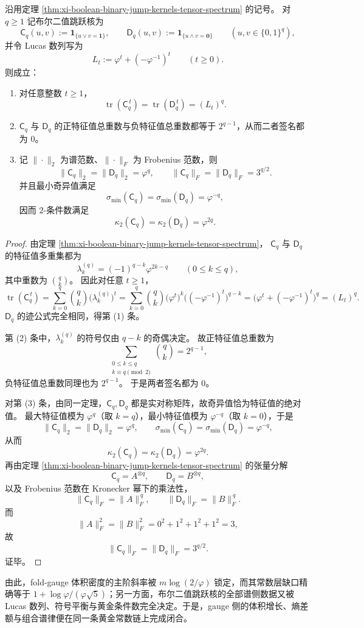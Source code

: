 \begin{theorem}\label{thm:conclusion-boolean-jump-kernel-lucas-inertia-norm}
沿用定理 \ref{thm:xi-boolean-binary-jump-kernels-tensor-spectrum} 的记号。
对 \(q\ge 1\) 记布尔二值跳跃核为
\[
\mathsf C_q(u,v):=\mathbf 1_{\{u\vee v=\mathbf 1\}},
\qquad
\mathsf D_q(u,v):=\mathbf 1_{\{u\wedge v=\mathbf 0\}}
\qquad
(u,v\in\{0,1\}^q),
\]
并令 Lucas 数列写为
\[
L_t:=\varphi^t+(-\varphi^{-1})^t
\qquad (t\ge 0).
\]
则成立：
\begin{enumerate}
  \item 对任意整数 \(t\ge 1\)，
  \[
  \operatorname{tr}(\mathsf C_q^{\,t})
  =
  \operatorname{tr}(\mathsf D_q^{\,t})
  =
  (L_t)^q.
  \]
  \item \(\mathsf C_q\) 与 \(\mathsf D_q\) 的正特征值总重数与负特征值总重数都等于 \(2^{q-1}\)，从而二者签名都为 \(0\)。
  \item 记 \(\|\cdot\|_2\) 为谱范数、\(\|\cdot\|_F\) 为 Frobenius 范数，则
  \[
  \|\mathsf C_q\|_2=\|\mathsf D_q\|_2=\varphi^q,
  \qquad
  \|\mathsf C_q\|_F=\|\mathsf D_q\|_F=3^{q/2}.
  \]
  并且最小奇异值满足
  \[
  \sigma_{\min}(\mathsf C_q)=\sigma_{\min}(\mathsf D_q)=\varphi^{-q},
  \]
  因而 \(2\)-条件数满足
  \[
  \kappa_2(\mathsf C_q)=\kappa_2(\mathsf D_q)=\varphi^{2q}.
  \]
\end{enumerate}
\end{theorem}
\begin{proof}
由定理 \ref{thm:xi-boolean-binary-jump-kernels-tensor-spectrum}，
\(\mathsf C_q\) 与 \(\mathsf D_q\) 的特征值多重集都为
\[
\lambda_k^{(q)}=(-1)^{q-k}\varphi^{2k-q}
\qquad (0\le k\le q),
\]
其中重数为 \(\binom qk\)。
因此对任意 \(t\ge 1\)，
\[
\operatorname{tr}(\mathsf C_q^{\,t})
=
\sum_{k=0}^{q}\binom qk\bigl(\lambda_k^{(q)}\bigr)^t
=
\sum_{k=0}^{q}\binom qk
\bigl(\varphi^t\bigr)^k
\bigl((-\varphi^{-1})^t\bigr)^{q-k}
=
\bigl(\varphi^t+(-\varphi^{-1})^t\bigr)^q
=
(L_t)^q.
\]
\(\mathsf D_q\) 的迹公式完全相同，得第 (1) 条。

第 (2) 条中，\(\lambda_k^{(q)}\) 的符号仅由 \(q-k\) 的奇偶决定。
故正特征值总重数为
\[
\sum_{\substack{0\le k\le q\\ k\equiv q\!\!\!\pmod 2}}\binom qk=2^{q-1},
\]
负特征值总重数同理也为 \(2^{q-1}\)。
于是两者签名都为 \(0\)。

对第 (3) 条，由同一定理，\(\mathsf C_q,\mathsf D_q\) 都是实对称矩阵，故奇异值恰为特征值的绝对值。
最大特征值模为 \(\varphi^q\)（取 \(k=q\)），最小特征值模为 \(\varphi^{-q}\)（取 \(k=0\)），于是
\[
\|\mathsf C_q\|_2=\|\mathsf D_q\|_2=\varphi^q,
\qquad
\sigma_{\min}(\mathsf C_q)=\sigma_{\min}(\mathsf D_q)=\varphi^{-q},
\]
从而
\[
\kappa_2(\mathsf C_q)=\kappa_2(\mathsf D_q)=\varphi^{2q}.
\]
再由定理 \ref{thm:xi-boolean-binary-jump-kernels-tensor-spectrum} 的张量分解
\[
\mathsf C_q=A^{\otimes q},
\qquad
\mathsf D_q=B^{\otimes q},
\]
以及 Frobenius 范数在 Kronecker 幂下的乘法性，
\[
\|\mathsf C_q\|_F=\|A\|_F^{\,q},
\qquad
\|\mathsf D_q\|_F=\|B\|_F^{\,q}.
\]
而
\[
\|A\|_F^2=\|B\|_F^2=0^2+1^2+1^2+1^2=3,
\]
故
\[
\|\mathsf C_q\|_F=\|\mathsf D_q\|_F=3^{q/2}.
\]
证毕。
\end{proof}

\noindent
由此，fold-gauge 体积密度的主阶斜率被 \(m\log(2/\varphi)\) 锁定，而其常数层缺口精确等于 \(1+\log\varphi/(\varphi\sqrt5)\)；另一方面，布尔二值跳跃核的全部谱侧数据又被 Lucas 数列、符号平衡与黄金条件数完全决定。于是，gauge 侧的体积增长、熵差额与组合谱律便在同一条黄金常数链上完成闭合。

\endinput
